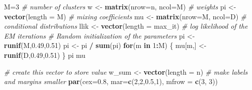 \documentclass[
]{article}
\newenvironment{Shaded}{\begin{snugshade}}{\end{snugshade}}
\newcommand{\AttributeTok}[1]{\textcolor[rgb]{0.13,0.29,0.53}{#1}}
\newcommand{\CommentTok}[1]{\textcolor[rgb]{0.56,0.35,0.01}{\textit{#1}}}
\newcommand{\ControlFlowTok}[1]{\textcolor[rgb]{0.13,0.29,0.53}{\textbf{#1}}}
\newcommand{\DecValTok}[1]{\textcolor[rgb]{0.00,0.00,0.81}{#1}}
\newcommand{\FloatTok}[1]{\textcolor[rgb]{0.00,0.00,0.81}{#1}}
\newcommand{\FunctionTok}[1]{\textcolor[rgb]{0.13,0.29,0.53}{\textbf{#1}}}
\newcommand{\NormalTok}[1]{#1}
\newcommand{\OtherTok}[1]{\textcolor[rgb]{0.56,0.35,0.01}{#1}}
\newcommand{\SpecialCharTok}[1]{\textcolor[rgb]{0.81,0.36,0.00}{\textbf{#1}}}
\begin{document}
\begin{Shaded}
\begin{Highlighting}[]
\NormalTok{M}\OtherTok{=}\DecValTok{3} \CommentTok{\# number of clusters}
\NormalTok{w }\OtherTok{\textless{}{-}} \FunctionTok{matrix}\NormalTok{(}\AttributeTok{nrow=}\NormalTok{n, }\AttributeTok{ncol=}\NormalTok{M) }\CommentTok{\# weights}
\NormalTok{pi }\OtherTok{\textless{}{-}} \FunctionTok{vector}\NormalTok{(}\AttributeTok{length =}\NormalTok{ M) }\CommentTok{\# mixing coefficients}
\NormalTok{mu }\OtherTok{\textless{}{-}} \FunctionTok{matrix}\NormalTok{(}\AttributeTok{nrow=}\NormalTok{M, }\AttributeTok{ncol=}\NormalTok{D) }\CommentTok{\# conditional distributions}
\NormalTok{llik }\OtherTok{\textless{}{-}} \FunctionTok{vector}\NormalTok{(}\AttributeTok{length =}\NormalTok{ max\_it) }\CommentTok{\# log likelihood of the EM iterations}
\CommentTok{\# Random initialization of the parameters}
\NormalTok{pi }\OtherTok{\textless{}{-}} \FunctionTok{runif}\NormalTok{(M,}\FloatTok{0.49}\NormalTok{,}\FloatTok{0.51}\NormalTok{)}
\NormalTok{pi }\OtherTok{\textless{}{-}}\NormalTok{ pi }\SpecialCharTok{/} \FunctionTok{sum}\NormalTok{(pi)}
\ControlFlowTok{for}\NormalTok{(m }\ControlFlowTok{in} \DecValTok{1}\SpecialCharTok{:}\NormalTok{M) \{}
\NormalTok{  mu[m,] }\OtherTok{\textless{}{-}} \FunctionTok{runif}\NormalTok{(D,}\FloatTok{0.49}\NormalTok{,}\FloatTok{0.51}\NormalTok{)}
\NormalTok{\}}
\NormalTok{pi}
\NormalTok{mu}

\CommentTok{\# create this vector to store value}
\NormalTok{w\_sum }\OtherTok{\textless{}{-}} \FunctionTok{vector}\NormalTok{(}\AttributeTok{length =}\NormalTok{ n)}
\CommentTok{\# make labels and margins smaller}
\FunctionTok{par}\NormalTok{(}\AttributeTok{cex=}\FloatTok{0.8}\NormalTok{, }\AttributeTok{mar=}\FunctionTok{c}\NormalTok{(}\DecValTok{2}\NormalTok{,}\DecValTok{2}\NormalTok{,}\FloatTok{0.5}\NormalTok{,}\DecValTok{1}\NormalTok{), }\AttributeTok{mfrow =} \FunctionTok{c}\NormalTok{(}\DecValTok{3}\NormalTok{, }\DecValTok{3}\NormalTok{))}


\end{Highlighting}
\end{Shaded}
\end{document}
